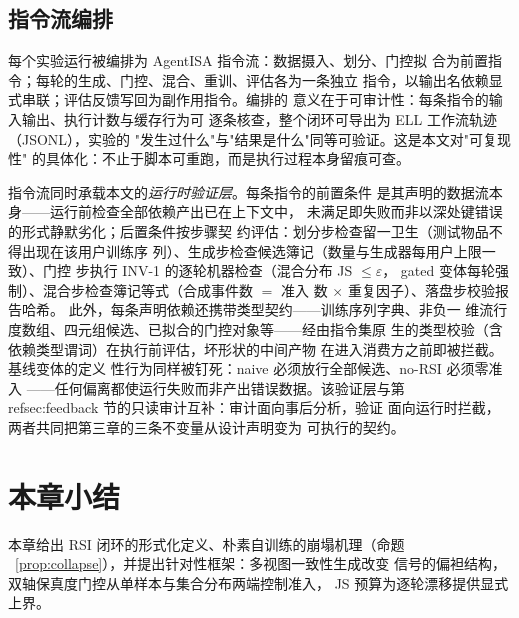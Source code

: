 \subsection{指令流编排}
每个实验运行被编排为 AgentISA 指令流：数据摄入、划分、门控拟
合为前置指令；每轮的生成、门控、混合、重训、评估各为一条独立
指令，以输出名依赖显式串联；评估反馈写回为副作用指令。编排的
意义在于可审计性：每条指令的输入输出、执行计数与缓存行为可
逐条核查，整个闭环可导出为 ELL 工作流轨迹（JSONL），实验的
"发生过什么"与"结果是什么"同等可验证。这是本文对"可复现性"
的具体化：不止于脚本可重跑，而是执行过程本身留痕可查。

指令流同时承载本文的\emph{运行时验证层}。每条指令的前置条件
是其声明的数据流本身——运行前检查全部依赖产出已在上下文中，
未满足即失败而非以深处键错误的形式静默劣化；后置条件按步骤契
约评估：划分步检查留一卫生（测试物品不得出现在该用户训练序
列）、生成步检查候选簿记（数量与生成器每用户上限一致）、门控
步执行 INV-1 的逐轮机器检查（混合分布 JS $\leq\varepsilon$，
gated 变体每轮强制）、混合步检查簿记等式（合成事件数 $=$ 准入
数 $\times$ 重复因子）、落盘步校验报告哈希。
此外，每条声明依赖还携带类型契约——训练序列字典、非负一
维流行度数组、四元组候选、已拟合的门控对象等——经由指令集原
生的类型校验（含依赖类型谓词）在执行前评估，坏形状的中间产物
在进入消费方之前即被拦截。基线变体的定义
性行为同样被钉死：naive 必须放行全部候选、no-RSI 必须零准入
——任何偏离都使运行失败而非产出错误数据。该验证层与第
~\\ref{sec:feedback} 节的只读审计互补：审计面向事后分析，验证
面向运行时拦截，两者共同把第三章的三条不变量从设计声明变为
可执行的契约。

\section{本章小结}
本章给出 RSI 闭环的形式化定义、朴素自训练的崩塌机理（命题
~\ref{prop:collapse}），并提出针对性框架：多视图一致性生成改变
信号的偏袒结构，双轴保真度门控从单样本与集合分布两端控制准入，
JS 预算为逐轮漂移提供显式上界。
